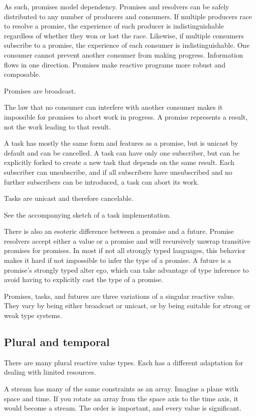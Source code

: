 As such, promises model dependency. Promises and resolvers can be safely distributed to any number of producers and consumers. If multiple producers race to resolve a promise, the experience of each producer is indistinguishable regardless of whether they won or lost the race. Likewise, if multiple consumers subscribe to a promise, the experience of each consumer is indistinguishable. One consumer cannot prevent another consumer from making progress. Information flows in one direction. Promises make reactive programs more robust and composable.

Promises are broadcast.

The law that no consumer can interfere with another consumer makes it impossible for promises to abort work in progress. A promise represents a result, not the work leading to that result.

A task has mostly the same form and features as a promise, but is unicast by default and can be cancelled. A task can have only one subscriber, but can be explicitly forked to create a new task that depends on the same result. Each subscriber can unsubscribe, and if all subscribers have unsubscribed and no further subscribers can be introduced, a task can abort its work.

Tasks are unicast and therefore cancelable.

See the accompanying sketch of a task implementation.

There is also an esoteric difference between a promise and a future. Promise resolvers accept either a value or a promise and will recursively unwrap transitive promises for promises. In most if not all strongly typed languages, this behavior makes it hard if not impossible to infer the type of a promise. A future is a promise’s strongly typed alter ego, which can take advantage of type inference to avoid having to explicitly cast the type of a promise.

Promises, tasks, and futures are three variations of a singular reactive value. They vary by being either broadcast or unicast, or by being suitable for strong or weak type systems.

\subsection{Plural and temporal}

There are many plural reactive value types. Each has a different adaptation for dealing with limited resources.

A stream has many of the same constraints as an array. Imagine a plane with space and time. If you rotate an array from the space axis to the time axis, it would become a stream. The order is important, and every value is significant.


